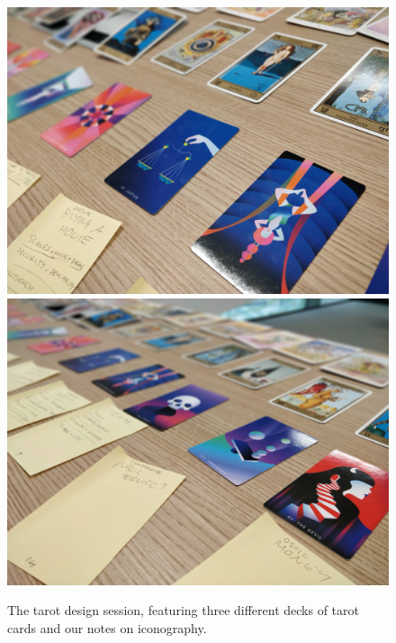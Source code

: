 \begin{figure}
    \centering
    \includegraphics[width=1\linewidth]{Images/8/tarot-design-1.jpg}
    \includegraphics[width=1\linewidth]{Images/8/tarot-design-2.jpg}
    \caption{The tarot design session, featuring three different decks of tarot cards and our notes on iconography.}
    \label{fig:tarot-design}
\end{figure}

